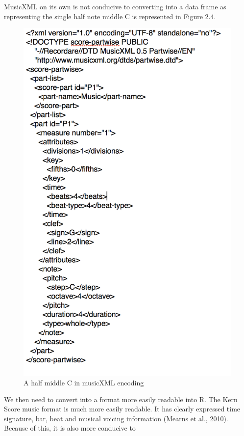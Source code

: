 \documentclass[12pt,twoside]{reedthesis}
\theoremstyle{definition}
\theoremstyle{definition}
\theoremstyle{definition}
\theoremstyle{remark}
\begin{document}
MusicXML on its own is not conducive to converting into a data frame as
representing the single half note middle C is represented in Figure 2.4.
\begin{figure}[h]
\centering
\includegraphics[scale=.4]{images/mxlc.png}
\caption{A half middle C in musicXML encoding}
\label{subd}
\end{figure}
We then need to convert into a format more easily readable into R. The
Kern Score music format is much more easily readable. It has clearly
expressed time signature, bar, beat and musical voicing information
(Mearns et al., 2010). Because of this, it is also more conducive to
\end{document}
